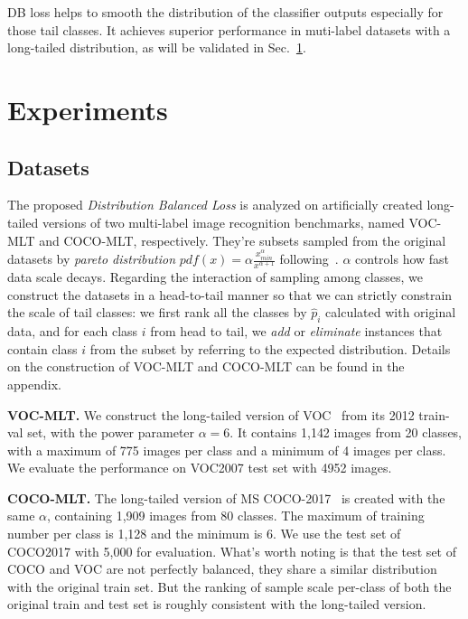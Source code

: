 \documentclass[runningheads]{llncs}
\begin{document}
DB loss helps to smooth the distribution of the classifier outputs especially for those tail classes. It achieves superior performance in muti-label datasets with a long-tailed distribution, as will be validated in Sec.~\ref{sec:experiment}. 

\section{Experiments}
\label{sec:experiment}

\subsection{Datasets}
The proposed \textit{Distribution Balanced Loss} is analyzed on artificially created long-tailed versions of two multi-label image recognition benchmarks, named VOC-MLT and COCO-MLT, respectively. 
They're subsets sampled from the original datasets by \textit{pareto distribution} $pdf(x) = \alpha \frac{x_{min}^\alpha}{x^{\alpha + 1}}$ following~\cite{liu2019largescale}. $\alpha$ controls how fast data scale decays.
Regarding the interaction of sampling among classes, we construct the datasets in a head-to-tail manner so that we can strictly constrain the scale of tail classes:
we first rank all the classes by $\hat{p}_i$ calculated with original data, and for each class $i$ from head to tail, we \textit{add} or \textit{eliminate} instances that contain class $i$ from the subset by referring to the expected distribution.
Details on the construction of VOC-MLT and COCO-MLT can be found in the appendix.

\noindent\textbf{VOC-MLT.} 
We construct the long-tailed version of VOC~\cite{Everingham2015voc} from its 2012 train-val set, with the power parameter $\alpha=6$.
It contains 1,142 images from 20 classes, with a maximum of 775 images per class and a minimum of 4 images per class.
We evaluate the performance on VOC2007 test set with 4952 images.
 
\noindent\textbf{COCO-MLT.}
The long-tailed version of MS COCO-2017~\cite{lin2014coco} is created with the same $\alpha$, containing 1,909 images from 80 classes. 
The maximum of training number per class is 1,128 and the minimum is 6. We use the test set of COCO2017 with 5,000 for evaluation. 
What's worth noting is that the test set of COCO and VOC are not perfectly balanced, they share a similar distribution with the original train set. But the ranking of sample scale per-class of both the original train and test set is roughly consistent with the long-tailed version.
\end{document}
